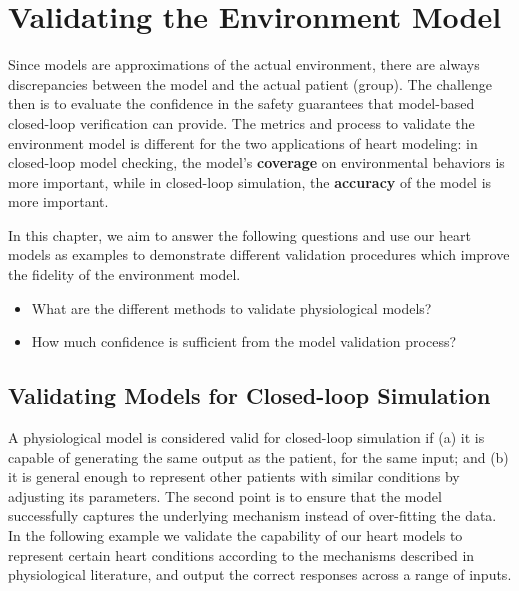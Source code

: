 

\section{Validating the Environment Model}
Since models are approximations of the actual environment, there are always discrepancies between the model and the actual patient (group). The challenge then is to evaluate the confidence in the safety guarantees that model-based closed-loop verification can provide. The metrics and process to validate the environment model is different for the two applications of heart modeling: in closed-loop model checking, the model's \textbf{coverage} on environmental behaviors is more important, while in closed-loop simulation, the \textbf{accuracy} of the model is more important. 

In this chapter, we aim to answer the following questions and use our heart models as examples to demonstrate different validation procedures which improve the fidelity of the environment model. 
\begin{itemize}
	\vspace{-5pt}
	\item What are the different methods to validate physiological models?
	\vspace{-5pt}
	\item How much confidence is sufficient from the model validation process?
\end{itemize}

\subsection{Validating Models for Closed-loop Simulation}
A physiological model is considered valid for closed-loop simulation if (a) it is capable of generating the same output as the patient, for the same input; and (b) it is general enough to represent other patients with similar conditions by adjusting its parameters. The second point is to ensure that the model successfully captures the underlying mechanism instead of over-fitting the data. In the following example we validate the capability of our heart models to represent certain heart conditions according to the mechanisms described in physiological literature, and  output the correct responses across a range of inputs.\\

